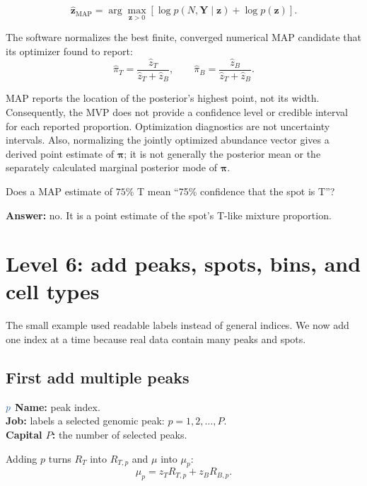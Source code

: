 \documentclass[11pt]{article}
\newcommand{\fixedq}[1]{\textcolor{fixedblue!75!black}{#1}}
\begin{document}
\[
\widehat{\boldsymbol z}_{\mathrm{MAP}}
=
\arg\max_{\boldsymbol z>0}
\left[
\log p(N,\boldsymbol Y\mid\boldsymbol z)
+\log p(\boldsymbol z)
\right].
\]

The software normalizes the best finite, converged numerical MAP candidate that
its optimizer found to report:
\[
\widehat\pi_T=
\frac{\widehat z_T}{\widehat z_T+\widehat z_B},
\qquad
\widehat\pi_B=
\frac{\widehat z_B}{\widehat z_T+\widehat z_B}.
\]

\begin{watchout}
MAP reports the location of the posterior's highest point, not its width.
Consequently, the MVP does not provide a confidence level or credible interval
for each reported proportion. Optimization diagnostics are not uncertainty
intervals. Also, normalizing the jointly optimized abundance vector gives a
derived point estimate of \(\boldsymbol\pi\); it is not generally the posterior mean
or the separately calculated marginal posterior mode of \(\boldsymbol\pi\).
\end{watchout}

\begin{checkpoint}
Does a MAP estimate of \(75\%\) T mean “75\% confidence that the spot is T”?

\textbf{Answer:} no. It is a point estimate of the spot's T-like mixture
proportion.
\end{checkpoint}

\section{Level 6: add peaks, spots, bins, and cell types}

The small example used readable labels instead of general indices. We now add one
index at a time because real data contain many peaks and spots.

\subsection{First add multiple peaks}

\begin{newvar}{\(\fixedq{p}\)}
\textbf{Name:} peak index.\\
\textbf{Job:} labels a selected genomic peak: \(p=1,2,\ldots,P\).\\
\textbf{Capital \(P\):} the number of selected peaks.
\end{newvar}

Adding \(p\) turns \(R_T\) into \(R_{T,p}\) and \(\mu\) into \(\mu_p\):
\[
\mu_p=z_TR_{T,p}+z_BR_{B,p}.
\]
\end{document}
